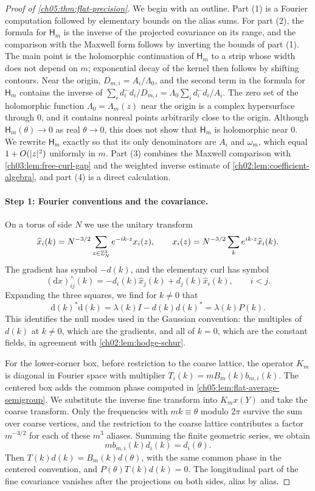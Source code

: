 \begin{proof}[Proof of \cref{ch05:thm:flat-precision}]
We begin with an outline. Part (1) is a Fourier computation followed by elementary bounds on the alias sums. For part (2), the formula for $\mathsf H_m$ is the inverse of the projected covariance on its range, and the comparison with the Maxwell form follows by inverting the bounds of part (1). The main point is the holomorphic continuation of $\mathsf H_m$ to a strip whose width does not depend on $m$; exponential decay of the kernel then follows by shifting contours. Near the origin, $D_{m,i}=A_i/\Lambda_0$, and the second term in the formula for $\mathsf H_m$ contains the inverse of $\sum_id_i^-d_i/D_{m,i}=\Lambda_0\sum_id_i^-d_i/A_i$. The zero set of the holomorphic function $\Lambda_0=\Lambda_m(z)$ near the origin is a complex hypersurface through $0$, and it contains nonreal points arbitrarily close to the origin. Although $\mathsf H_m(\theta)\to0$ as real $\theta\to0$, this does not show that $\mathsf H_m$ is holomorphic near $0$. We rewrite $\mathsf H_m$ exactly so that its only denominators are $A_i$ and $\omega_m$, which equal $1+O(\lvert z\rvert^2)$ uniformly in $m$. Part (3) combines the Maxwell comparison with \cref{ch03:lem:free-curl-gap} and the weighted inverse estimate of \cref{ch02:lem:coefficient-algebra}, and part (4) is a direct calculation.

\paragraph{Step 1: Fourier conventions and the covariance.}
On a torus of side $N$ we use the unitary transform
\[
 \widehat x_i(k)=N^{-3/2}\sum_{z\in\mathbb Z_N^3}e^{-ik\cdot z}x_i(z),\qquad x_i(z)=N^{-3/2}\sum_ke^{ik\cdot z}\widehat x_i(k).
\]
The gradient has symbol $-d(k)$, and the elementary curl has symbol
\[
 (\mathrm dx)^\wedge_{ij}(k)=-d_i(k)\widehat x_j(k)+d_j(k)\widehat x_i(k),\qquad i<j.
\]
Expanding the three squares, we find for $k\ne0$ that
\begin{equation}\label{ch05:eq:curl-symbol}
 \mathrm d(k)^*\mathrm d(k)=\lambda(k)I-d(k)d(k)^*=\lambda(k)P(k).
\end{equation}
This identifies the null modes used in the Gaussian convention: the multiples of $d(k)$ at $k\ne0$, which are the gradients, and all of $k=0$, which are the constant fields, in agreement with \cref{ch02:lem:hodge-schur}.

For the lower-corner box, before restriction to the coarse lattice, the operator $K_m$ is diagonal in Fourier space with multiplier $T_i(k)=mB_m(k)b_{m,i}(k)$. The centered box adds the common phase computed in \cref{ch05:lem:flat-average-semigroup}. We substitute the inverse fine transform into $K_mx(Y)$ and take the coarse transform. Only the frequencies with $mk\equiv\theta$ modulo $2\pi$ survive the sum over coarse vertices, and the restriction to the coarse lattice contributes a factor $m^{-3/2}$ for each of these $m^3$ aliases. Summing the finite geometric series, we obtain
\[
 mb_{m,i}(k)d_i(k)=d_i(\theta).
\]
Then $T(k)d(k)=B_m(k)d(\theta)$, with the same common phase in the centered convention, and $P(\theta)T(k)d(k)=0$. The longitudinal part of the fine covariance vanishes after the projections on both sides, alias by alias.


\end{proof}
